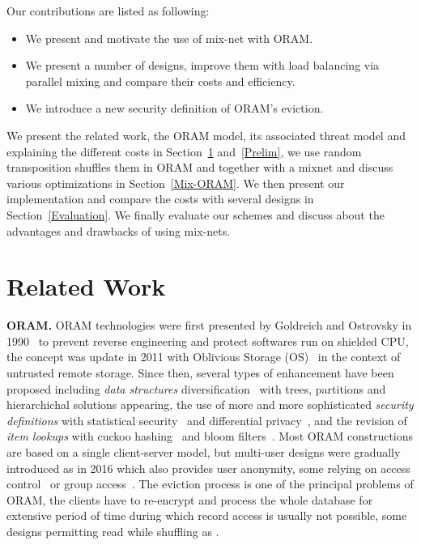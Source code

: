 \documentclass[USenglish,oneside,twocolumn]{article}
\begin{document}
Our contributions are listed as following:

\begin{itemize}
 \item We present and motivate the use of mix-net with ORAM.
 \item We present a number of designs, improve them with load balancing via parallel mixing and compare their costs and efficiency.
 \item We introduce a new security definition of ORAM's eviction. %
\end{itemize}

We present the related work, the ORAM model, its associated threat model and explaining the different costs in Section~\ref{Related} and~\ref{Prelim}, we use random transposition shuffles them in ORAM and together with a mixnet and discuss various optimizations in Section~\ref{Mix-ORAM}. We then present our implementation and compare the costs with several designs in Section~\ref{Evaluation}.
We finally evaluate our schemes and discuss about the advantages and drawbacks of using mix-nets.
%

\section{Related Work}\label{Related}
\noindent\textbf{ORAM.}
ORAM technologies were first presented by Goldreich and Ostrovsky in 1990~\cite{ostrovsky1990efficient} to prevent reverse engineering and protect softwares run on shielded CPU, the concept was update in 2011 with Oblivious Storage (OS)~\cite{boneh2011} in the context of untrusted remote storage.
Since then, several types of enhancement have been proposed including \textit{data structures} diversification~\cite{goldreich1996software,stefanov2011towards,stefanov2013path,ren2014ring} with trees, partitions and hierarchichal solutions appearing,
the use of more and more sophisticated \textit{security definitions} with statistical security~\cite{damgaard2011perfectly,ajtai2010oblivious} and differential privacy~\cite{wagh2016root}, and the revision of \textit{item lookups} with cuckoo hashing~\cite{pinkas2010oblivious} and bloom filters~\cite{williams2008building}.
Most ORAM constructions are based on a single client-server model, but multi-user designs were gradually introduced as \cite{backesanonymous} in 2016 which also provides user anonymity, some relying on access control~\cite{franz2011oblivious} or group access~\cite{goodrich2012privacy}.
The eviction process is one of the principal problems of ORAM, the clients have to re-encrypt and process the whole database for extensive period of time during which record access is usually not possible, some designs permitting read while shuffling as \cite{boneh2011}.\\
\end{document}
